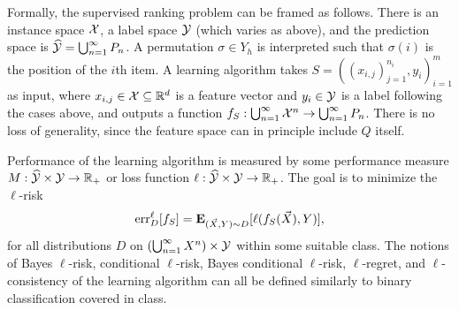 Formally, the supervised ranking problem can be framed as follows. There is an
instance space ${\mathcal X}$, a label space ${\mathcal Y}$ (which varies as above), and the
prediction space is $\widehat{\mathcal{Y}} = \bigcup_{n=1}^\infty P_n$. A permutation
$\sigma \in Y_h$ is interpreted such that $\sigma(i)$ is the position of the
$i$th item. A learning algorithm
takes $S = ((x_{i,j})_{j=1}^{n_i}, y_i)_{i=1}^m$ as input,
where $x_{i,j} \in {\mathcal X} \subseteq {\mathbb R}^d$ is a feature vector
and $y_i \in {\mathcal Y}$ is a label following the cases above,
and outputs a function
$f_S: \bigcup_{n=1}^\infty {\mathcal X}^n \to \bigcup_{n=1}^\infty P_n$.
There is no loss of generality, since the feature space can in principle 
include $Q$ itself.

Performance of the learning algorithm is measured by some performance measure
$M: \widehat{\mathcal{Y}} \times {\mathcal Y} \to {\mathbb R}_+$ or loss function
$\ell: \widehat{\mathcal{Y}} \times {\mathcal Y} \to {\mathbb R}_+$. The goal is to minimize the $\ell$-risk
\begin{align*}
  \text{err}_D^\ell[f_S] = {\mathbf E}_{(\vec{X}, Y) \sim D} [\ell(f_S(\vec{X}), Y)],
\end{align*}
for all distributions $D$ on $(\bigcup_{n=1}^\infty X^n) \times {\mathcal Y}$
within some suitable class.
The notions of Bayes $\ell$-risk, conditional $\ell$-risk,
Bayes conditional $\ell$-risk, $\ell$-regret, and $\ell$-consistency of the
learning algorithm can all be defined similarly to binary classification
covered in class.

